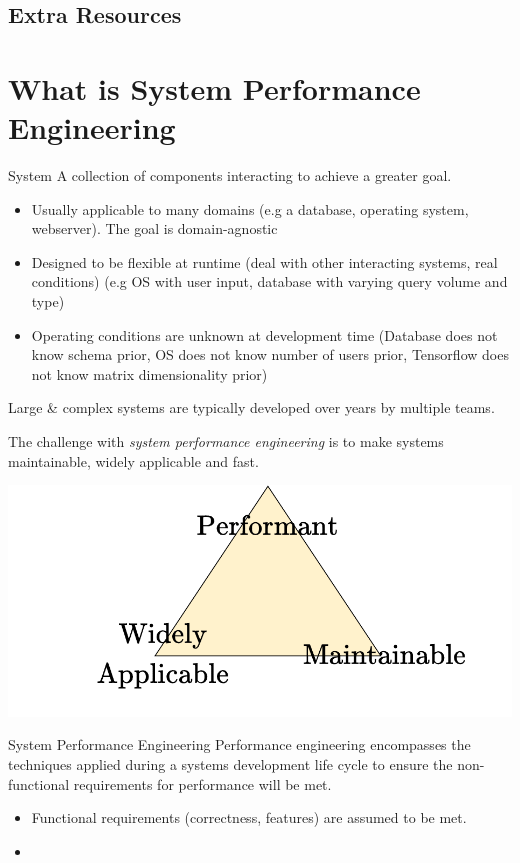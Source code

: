 \subsection{Extra Resources}
\unfinished

\section{What is System Performance Engineering}
\begin{definitionbox}{System}
    A collection of components interacting to achieve a greater goal.
    \begin{itemize}
        \item Usually applicable to many domains (e.g a database, operating system, webserver). The goal is domain-agnostic
        \item Designed to be flexible at runtime (deal with other interacting systems, real conditions) (e.g OS with user input, database with varying query volume and type)
        \item Operating conditions are unknown at development time (Database does not know schema prior, OS does not know number of users prior, Tensorflow does not know matrix dimensionality prior)
    \end{itemize}
    Large \& complex systems are typically developed over years by multiple teams.
\end{definitionbox}

The challenge with \textit{system performance engineering} is to make systems maintainable, widely applicable and fast.
\begin{center}
    \includegraphics[width=.6\textwidth]{introduction/images/holy_triangle.drawio}
\end{center} 

\begin{definitionbox}{System Performance Engineering}
    Performance engineering encompasses the techniques applied during a systems development life cycle to ensure the non-functional
    requirements for performance will be met.
    \begin{itemize}
        \item Functional requirements (correctness, features) are assumed to be met.
        \item 
    \end{itemize} 
\end{definitionbox}

